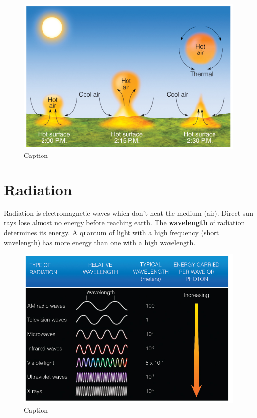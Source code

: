 \documentclass[oneside]{book}
\begin{document}
\begin{figure}

{\centering \includegraphics[width=0.7\linewidth]{figures/Figure119} 

}

\caption{Caption}\label{fig:Heattransfer3}
\end{figure}

\section{Radiation}\label{radiation}

Radiation is electromagnetic waves which don't heat the medium (air).
Direct sun rays lose almost no energy before reaching earth. The
\textbf{wavelength} of radiation determines its energy. A quantum of
light with a high frequency (short wavelength) has more energy than one
with a high wavelength.

\begin{figure}

{\centering \includegraphics[width=0.8\linewidth]{figures/Figure120} 

}

\caption{Caption}\label{fig:Radiation}
\end{figure}
\end{document}
